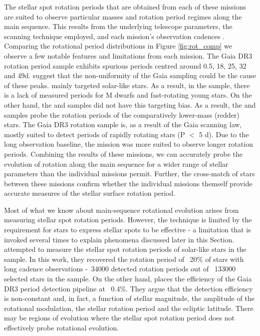The stellar spot rotation periods that are obtained from each of these missions are suited to observe particular masses and rotation period regimes along the main sequence.
This results from the underlying telescope parameters, the scanning technique employed, and each mission's observation cadences \citep{distefano_determination_2012}.
Comparing the rotational period distributions in Figure \ref{fig:rot_comp} we observe a few notable features and limitations from each mission.
The Gaia DR3 rotation period sample exhibits spurious periods centred around 0.5, 18, 25, 32 and 49d.
\citet{distefano_gaia_2022} suggest that the non-uniformity of the Gaia sampling could be the cause of these peaks.
\kepler{} mainly targeted solar-like stars.
As a result, in the \kepler{} sample, there is a lack of measured periods for M dwarfs and fast-rotating young stars.
On the other hand, the \ZTF{} and \gaia{} samples did not have this targeting bias.
As a result, the \ZTF{} and \gaia{} samples probe the rotation periods of the comparatively lower-mass (redder) stars.
The Gaia DR3 rotation sample is, as a result of the Gaia scanning law, mostly suited to detect periods of rapidly rotating stars (P $<$ 5 d).
Due to the long observation baseline, the \ZTF{} mission was more suited to observe longer rotation periods.
Combining the results of these missions, we can accurately probe the evolution of rotation along the main sequence for a wider range of stellar parameters than the individual missions permit.
Further, the cross-match of stars between these missions confirm whether the individual missions themself provide accurate measures of the stellar surface rotation period.

Most of what we know about main-sequence rotational evolution arises from measuring stellar spot rotation periods.
However, the technique is limited by the requirement for stars to express stellar spots to be effective - a limitation that is invoked several times to explain phenomena discussed later in this Section. 
\citet{mcquillan_rotation_2014} attempted to measure the stellar spot rotation periods of solar-like stars in the \kepler{} sample.
In this work, they recovered the rotation period of ~20\% of stars with long cadence observations -~34000 detected rotation periods out of ~133000 selected stars in the sample.
On the other hand, \citet{distefano_gaia_2022} places the efficiency of the Gaia DR3 period detection pipeline at ~0.4\%.
They argue that the detection efficiency is non-constant and, in fact, a function of stellar magnitude, the amplitude of the rotational modulation, the stellar rotation period and the ecliptic latitude.
There may be regions of evolution where the stellar spot rotation period does not effectively probe rotational evolution.

